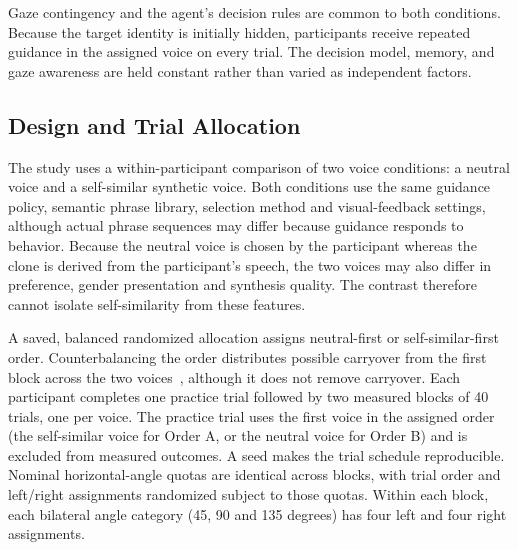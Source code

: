 Gaze contingency and the agent's decision rules are common to both conditions. Because the target identity is initially hidden, participants receive repeated guidance in the assigned voice on every trial. The decision model, memory, and gaze awareness are held constant rather than varied as independent factors.

\subsection{Design and Trial Allocation}
The study uses a within-participant comparison of two voice conditions: a neutral voice and a self-similar synthetic voice. Both conditions use the same guidance policy, semantic phrase library, selection method and visual-feedback settings, although actual phrase sequences may differ because guidance responds to behavior. Because the neutral voice is chosen by the participant whereas the clone is derived from the participant's speech, the two voices may also differ in preference, gender presentation and synthesis quality. The contrast therefore cannot isolate self-similarity from these features.

A saved, balanced randomized allocation assigns neutral-first or self-similar-first order. Counterbalancing the order distributes possible carryover from the first block across the two voices~\cite{williams1949residual}, although it does not remove carryover. Each participant completes one practice trial followed by two measured blocks of 40 trials, one per voice. The practice trial uses the first voice in the assigned order (the self-similar voice for Order A, or the neutral voice for Order B) and is excluded from measured outcomes. A seed makes the trial schedule reproducible. Nominal horizontal-angle quotas are identical across blocks, with trial order and left/right assignments randomized subject to those quotas. Within each block, each bilateral angle category (45, 90 and 135 degrees) has four left and four right assignments.

